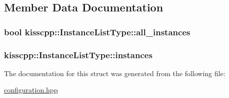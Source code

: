 \subsection{Member Data Documentation}
\hypertarget{structkisscpp_1_1_instance_list_type_a369b1be877ef96e3b30fbc5e7c1fb429}{
\subsubsection[{all\-\_\-instances}]{\setlength{\rightskip}{0pt plus 5cm}bool kisscpp\-::\-Instance\-List\-Type\-::all\-\_\-instances}}\label{structkisscpp_1_1_instance_list_type_a369b1be877ef96e3b30fbc5e7c1fb429}
\hypertarget{structkisscpp_1_1_instance_list_type_ab41a6811d252741bb3000bc13733e19b}{
\subsubsection[{instances}]{ kisscpp\-::\-Instance\-List\-Type\-::instances}}\label{structkisscpp_1_1_instance_list_type_ab41a6811d252741bb3000bc13733e19b}


The documentation for this struct was generated from the following file\-:\begin{DoxyCompactItemize}
\item 
\hyperlink{configuration_8hpp}{configuration.\-hpp}\end{DoxyCompactItemize}
